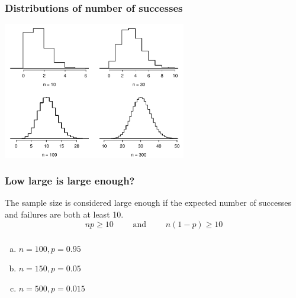 \begin{frame}
\frametitle{Distributions of number of successes}


\begin{center}
\includegraphics[width=0.60\textwidth]{4-3_binomial_distribution/figures/fourBinomialModelsShowingApproxToNormal/fourBinomialModelsShowingApproxToNormal}
\end{center}

\end{frame}


\begin{frame}
\frametitle{Low large is large enough?}

The sample size is considered large enough if the expected number of successes and failures are both at least 10.
\[ np \ge 10 \qquad \text{ and } \qquad n(1-p) \ge 10 \]


\end{frame}


\begin{frame}
\frametitle{}


\begin{enumerate}[(a)]
\item $n = 100, p = 0.95$
 
\item $n = 150, p = 0.05$
\item $n = 500, p = 0.015$
\end{enumerate}

\end{frame}


